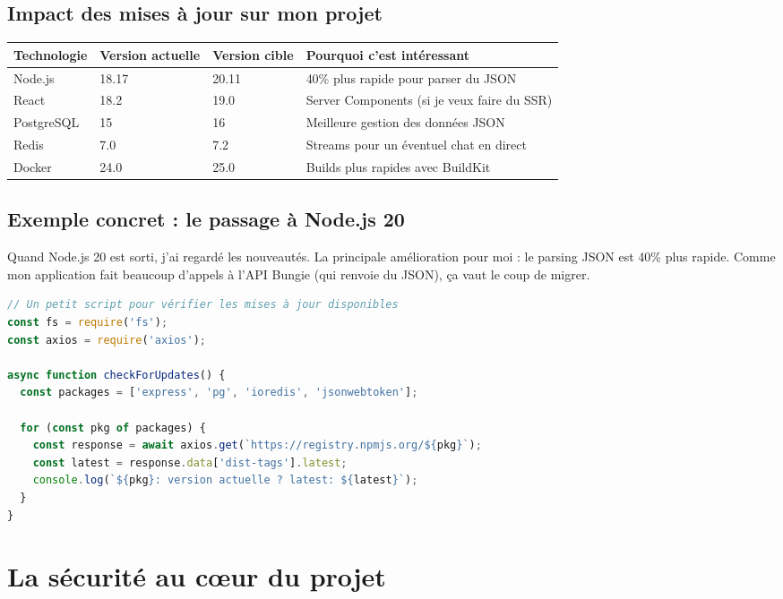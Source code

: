 \subsection{Impact des mises à jour sur mon projet}

\begin{center}
\begin{tabular}{|l|l|l|l|}
\hline
\textbf{Technologie} & \textbf{Version actuelle} & \textbf{Version cible} & \textbf{Pourquoi c'est intéressant} \\
\hline
Node.js & 18.17 & 20.11 & 40\% plus rapide pour parser du JSON \\
React & 18.2 & 19.0 & Server Components (si je veux faire du SSR) \\
PostgreSQL & 15 & 16 & Meilleure gestion des données JSON \\
Redis & 7.0 & 7.2 & Streams pour un éventuel chat en direct \\
Docker & 24.0 & 25.0 & Builds plus rapides avec BuildKit \\
\hline
\end{tabular}
\end{center}

\subsection{Exemple concret : le passage à Node.js 20}

Quand Node.js 20 est sorti, j'ai regardé les nouveautés. La principale amélioration pour moi : le parsing JSON est 40\% plus rapide. Comme mon application fait beaucoup d'appels à l'API Bungie (qui renvoie du JSON), ça vaut le coup de migrer.

\begin{lstlisting}[language=JavaScript]
// Un petit script pour vérifier les mises à jour disponibles
const fs = require('fs');
const axios = require('axios');

async function checkForUpdates() {
  const packages = ['express', 'pg', 'ioredis', 'jsonwebtoken'];
  
  for (const pkg of packages) {
    const response = await axios.get(`https://registry.npmjs.org/${pkg}`);
    const latest = response.data['dist-tags'].latest;
    console.log(`${pkg}: version actuelle ? latest: ${latest}`);
  }
}
\end{lstlisting}

\section{La sécurité au cœur du projet}

